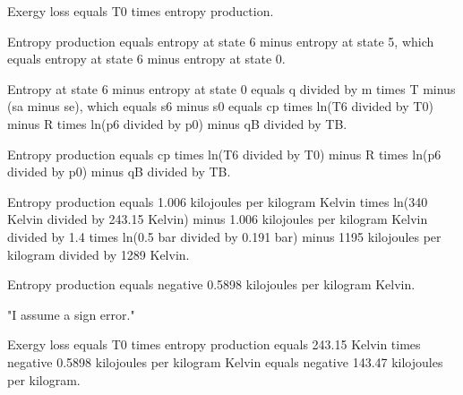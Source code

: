 Exergy loss equals T0 times entropy production.  

Entropy production equals entropy at state 6 minus entropy at state 5, which equals entropy at state 6 minus entropy at state 0.  

Entropy at state 6 minus entropy at state 0 equals q divided by m times T minus (sa minus se), which equals s6 minus s0 equals cp times ln(T6 divided by T0) minus R times ln(p6 divided by p0) minus qB divided by TB.  

Entropy production equals cp times ln(T6 divided by T0) minus R times ln(p6 divided by p0) minus qB divided by TB.  

Entropy production equals 1.006 kilojoules per kilogram Kelvin times ln(340 Kelvin divided by 243.15 Kelvin) minus 1.006 kilojoules per kilogram Kelvin divided by 1.4 times ln(0.5 bar divided by 0.191 bar) minus 1195 kilojoules per kilogram divided by 1289 Kelvin.  

Entropy production equals negative 0.5898 kilojoules per kilogram Kelvin.  

"I assume a sign error."  

Exergy loss equals T0 times entropy production equals 243.15 Kelvin times negative 0.5898 kilojoules per kilogram Kelvin equals negative 143.47 kilojoules per kilogram.